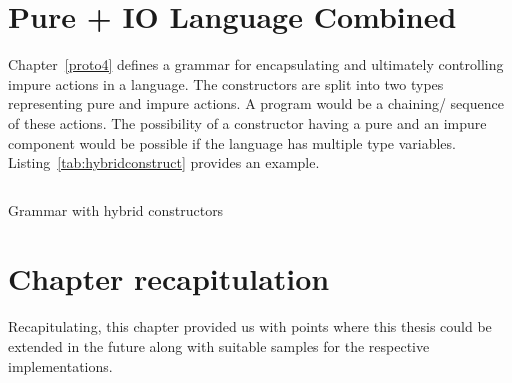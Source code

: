 \documentclass[thesis-solanki.tex]{subfiles}
\begin{document}
\section{Pure + IO Language Combined}
Chapter~\ref{proto4} defines a grammar for encapsulating and ultimately controlling impure actions in a language. The constructors are split
into two types representing pure and impure actions. A program would be a chaining/ sequence of these actions. The possibility of a 
constructor having a pure and an impure component would be possible if the language has multiple type variables. 
Listing~\ref{tab:hybridconstruct} provides an example.


\begin{code-list}[H]
\begin{singlespace}
\inputminted{haskell}{haskell-proto4-hybrid-construct.hs}
\end{singlespace}
\caption{Grammar with hybrid constructors}
\label{tab:hybridconstruct}
\end{code-list}



\section{Chapter recapitulation}
Recapitulating, this chapter provided us with points where this thesis could be extended in the future along with suitable samples for the
respective implementations.


\ifMain
\begin{scope}
  \nolinenumbers
  \enotesize
  \par
  \begin{singlespace}
  \setlength{\parskip}{12pt plus 2pt minus 1pt}
  \theendnotes
  \par
  \end{singlespace}
\end{scope}
\fi
\end{document}
